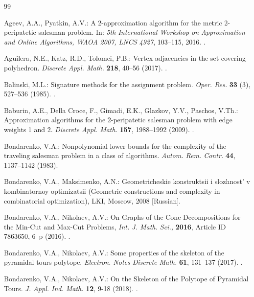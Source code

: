 \documentclass[runningheads]{llncs}
\begin{document}

\begin{thebibliography}{99}
	
	Ageev, A.A., Pyatkin, A.V.: 
	A 2-approximation algorithm for the metric 2-peripatetic salesman problem.
	In: {\em 5th International Workshop on Approximation and Online Algorithms, WAOA 2007, LNCS 4927}, 103--115, 2016.
	.
	
	
	Aguilera, N.E., Katz, R.D., Tolomei, P.B.: 
	Vertex adjacencies in the set covering polyhedron. 
	{\em Discrete Appl. Math.} {\bf 218}, 40--56 (2017).
	.
	
	
	Balinski, M.L.: 
	Signature methods for the assignment problem.
	{\em Oper. Res.} {\bf 33} (3), 527--536 (1985).
	.
	
	
	Baburin, A.E., Della Croce, F., Gimadi, E.K., Glazkov, Y.V., Paschos, V.Th.: 
	Approximation algorithms for the 2-peripatetic salesman problem with edge weights 1 and 2.
	{\em Discrete Appl. Math.} {\bf 157}, 1988--1992 (2009).
	.
	
	
	Bondarenko, V.A.:
	Nonpolynomial lower bounds for the complexity of the traveling salesman problem in a class of algorithms.
	{\em Autom. Rem. Contr.} {\bf 44}, 1137--1142 (1983).
	
	
	Bondarenko, V.A., Maksimenko, A.N.:
	Geometricheskie konstruktsii i slozhnost' v kombinatornoy optimizatsii (Geometric constructions and complexity in combinatorial optimization), LKI, Moscow, 2008 [Russian].
	
	
	Bondarenko, V.A., Nikolaev, A.V.:
	On Graphs of the Cone Decompositions for the Min-Cut and Max-Cut Problems,
	{\em Int. J. Math. Sci.,} {\bf 2016}, Article ID 7863650, 6~p (2016).
	.
	
	
	Bondarenko, V.A., Nikolaev, A.V.:
	Some properties of the skeleton of the pyramidal tours polytope.
	{\em Electron. Notes Discrete Math.} {\bf 61}, 131--137 (2017).
	.
	
	
	Bondarenko, V.A., Nikolaev, A.V.:
	On the Skeleton of the Polytope of Pyramidal Tours.
	{\em J. Appl. Ind. Math.} {\bf 12}, 9-18 (2018).
	.
	

\end{thebibliography}
\end{document}
